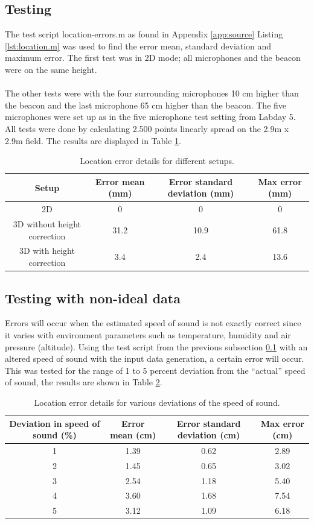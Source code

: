 \documentclass[final]{scrreprt} %
\begin{document}
\subsection{Testing}
\label{sec:testing}
The test script location-errors.m as found in Appendix \ref{app:source} Listing \ref{lst:location.m} was used to find the error mean, standard deviation and maximum error.
The first test was in 2D mode; all microphones and the beacon were on the same height.
\\ \\
The other tests were with the four surrounding microphones 10 cm higher than the beacon and the last microphone 65 cm higher than the beacon.
The five microphones were set up as in the five microphone test setting from Labday 5.
All tests were done by calculating 2.500 points linearly spread on the 2.9m x 2.9m field.
The results are displayed in Table \ref{tab:errors}.

\begin{table} [H]
\centering
	\begin{tabular}{ c | c | c | c }
  	Setup & Error mean (mm) & Error standard deviation (mm) & Max error (mm) \\ \hline
  	2D & 0 & 0 & 0 \\
  	3D without height correction & 31.2 & 10.9 & 61.8 \\
	3D with height correction & 3.4 & 2.4 & 13.6 \\
	\end{tabular}
\caption{Location error details for different setups.}
\label{tab:errors}
\end{table}

\subsection{Testing with non-ideal data}
Errors will occur when the estimated speed of sound is not exactly correct since it varies with environment parameters such as temperature, humidity and air pressure (altitude).
Using the test script from the previous subsection \ref{sec:testing} with an altered speed of sound with the input data generation, a certain error will occur.
This was tested for the range of 1 to 5 percent deviation from the ``actual'' speed of sound, the results are shown in Table \ref{tab:c-errors}.

\begin{table} [H]
\centering
	\begin{tabular}{ c | c | c | c }
  	Deviation in speed of sound (\%) & Error mean (cm) & Error standard deviation (cm) & Max error (cm) \\ \hline
  	1 & 1.39 & 0.62 & 2.89 \\
	2 & 1.45 & 0.65 & 3.02 \\
	3 & 2.54 & 1.18 & 5.40 \\
	4 & 3.60 & 1.68 & 7.54 \\
  	5 & 3.12 & 1.09 & 6.18 \\
	\end{tabular}
\caption{Location error details for various deviations of the speed of sound.}
\label{tab:c-errors}
\end{table}
\end{document}
